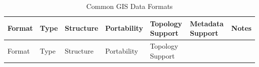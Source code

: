 \documentclass[
  letterpaper,
]{book}
\begin{document}
\begin{longtable}[]{@{}
  >{\raggedright\arraybackslash}p{}
  >{\raggedright\arraybackslash}p{}
  >{\raggedright\arraybackslash}p{}
  >{\raggedright\arraybackslash}p{}
  >{\raggedright\arraybackslash}p{}
  >{\raggedright\arraybackslash}p{}
  >{\raggedright\arraybackslash}p{}@{}}
\caption{Common GIS Data Formats}\label{tbl-formats}\tabularnewline
\toprule\noalign{}
\begin{minipage}[b]{\linewidth}\raggedright
Format
\end{minipage} & \begin{minipage}[b]{\linewidth}\raggedright
Type
\end{minipage} & \begin{minipage}[b]{\linewidth}\raggedright
Structure
\end{minipage} & \begin{minipage}[b]{\linewidth}\raggedright
Portability
\end{minipage} & \begin{minipage}[b]{\linewidth}\raggedright
Topology Support
\end{minipage} & \begin{minipage}[b]{\linewidth}\raggedright
Metadata Support
\end{minipage} & \begin{minipage}[b]{\linewidth}\raggedright
Notes
\end{minipage} \\
\midrule\noalign{}
\endfirsthead
\toprule\noalign{}
\begin{minipage}[b]{\linewidth}\raggedright
Format
\end{minipage} & \begin{minipage}[b]{\linewidth}\raggedright
Type
\end{minipage} & \begin{minipage}[b]{\linewidth}\raggedright
Structure
\end{minipage} & \begin{minipage}[b]{\linewidth}\raggedright
Portability
\end{minipage} & \begin{minipage}[b]{\linewidth}\raggedright
Topology Support
\end{minipage} & \begin{minipage}[b]{\linewidth}\raggedright

\end{minipage}
\end{longtable}
\end{document}

